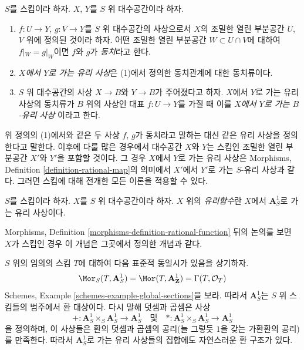 \begin{definition}
\label{definition-rational-map}
$S$를 스킴이라 하자. $X$, $Y$를 $S$ 위 대수공간이라 하자.
\begin{enumerate}
\item $f : U \to Y$, $g : V \to Y$를 $S$ 위 대수공간의 사상으로서
$X$의 조밀한 열린 부분공간 $U$, $V$ 위에 정의된 것이라 하자. 어떤
조밀한 열린 부분공간 $W \subset U \cap V$에 대하여
$f|_W = g|_W$이면 $f$와 $g$가 {\it 동치}라고 한다.
\item {\it $X$에서 $Y$로 가는 유리 사상}은 (1)에서 정의한 동치관계에
대한 동치류이다.
\item $S$ 위 대수공간의 사상 $X \to B$와 $Y \to B$가 주어졌다고 하자.
$X$에서 $Y$로 가는 유리 사상의 동치류가 $B$ 위의 사상인 대표
$f : U \to Y$를 가질 때 이를 {\it $X$에서 $Y$로 가는 $B$-유리 사상}
이라고 한다.
\end{enumerate}
\end{definition}

\noindent
위 정의의 (1)에서와 같은 두 사상 $f$, $g$가 동치라고 말하는 대신 같은
유리 사상을 정의한다고 말한다. 이후에 다룰 많은 경우에서 대수공간
$X$와 $Y$는 스킴인 조밀한 열린 부분공간 $X'$와 $Y'$을 포함할 것이다.
그 경우 $X$에서 $Y$로 가는 유리 사상은 Morphisms, Definition
\ref{definition-rational-map}의 의미에서 $X'$에서 $Y'$로 가는
$S$-유리 사상과 같다. 그러면 스킴에 대해 전개한 모든 이론을 적용할 수
있다.

\begin{definition}
\label{definition-rational-function}
$S$를 스킴이라 하자. $X$를 $S$ 위 대수공간이라 하자. $X$ 위의
{\it 유리함수}란 $X$에서 $\mathbf{A}^1_S$로 가는 유리 사상이다.
\end{definition}

\noindent
Morphisms, Definition \ref{morphisms-definition-rational-function} 뒤의
논의를 보면 $X$가 스킴인 경우 이 개념은 그곳에서 정의한 개념과 같다.

\medskip\noindent
$S$ 위의 임의의 스킴 $T$에 대하여 다음 표준적 동일시가 있음을 상기하자.
$$
\Mor_S(T, \mathbf{A}^1_S) = \Mor(T, \mathbf{A}^1_\mathbf{Z}) =
\Gamma(T, \mathcal{O}_T)
$$
Schemes, Example \ref{schemes-example-global-sections}을 보라.
따라서 $\mathbf{A}^1_S$는 $S$ 위 스킴들의 범주에서 환 대상이다. 다시
말해 덧셈과 곱셈은 사상
$$
+ : \mathbf{A}^1_S \times_S \mathbf{A}^1_S \to \mathbf{A}^1_S
\quad\text{및}\quad
* : \mathbf{A}^1_S \times_S \mathbf{A}^1_S \to \mathbf{A}^1_S
$$
을 정의하며, 이 사상들은 환의 덧셈과 곱셈의 공리(늘 그렇듯 $1$을 갖는
가환환의 공리)를 만족한다. 따라서 $\mathbf{A}^1_S$로 가는 유리 사상들의
집합에도 자연스러운 환 구조가 있다.

